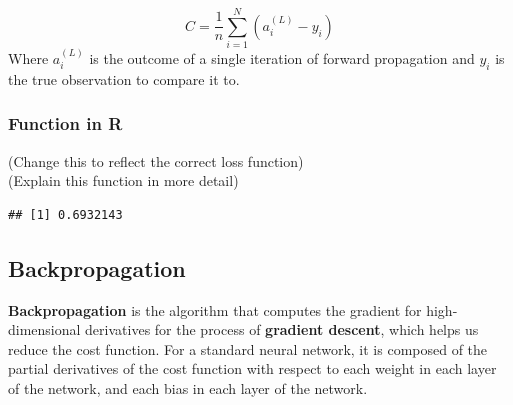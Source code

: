 \[
C = \frac{1}{n} \sum_{i=1}^N (a^{(L)}_i - y_i)
\] Where \(a^{(L)}_i\) is the outcome of a single iteration of forward
propagation and \(y_i\) is the true observation to compare it to.

\hypertarget{function-in-r-3}{%
\subsubsection{Function in R}\label{function-in-r-3}}

(Change this to reflect the correct loss function)\\
(Explain this function in more detail)

\begin{Shaded}
\begin{Highlighting}[]
\OtherTok{\textless{}{-}} 
\OtherTok{\textless{}{-}} \NormalTok{(X)[}\NormalTok{]}
\OtherTok{\textless{}{-}}\NormalTok{ cache[[}\NormalTok{]]  }
\OtherTok{\textless{}{-}}\NormalTok{ (}\SpecialCharTok{*}\SpecialCharTok{+}\NormalTok{ (}\NormalTok{(}\SpecialCharTok{{-}}\SpecialCharTok{*}\NormalTok{ (}\SpecialCharTok{{-}}
\OtherTok{\textless{}{-}} \SpecialCharTok{{-}}\SpecialCharTok{/}
\NormalTok{\}}
\OtherTok{\textless{}{-}} 
\end{Highlighting}
\end{Shaded}

\begin{verbatim}
## [1] 0.6932143
\end{verbatim}

\hypertarget{backpropagation}{%
\subsection{Backpropagation}\label{backpropagation}}

\textbf{Backpropagation} is the algorithm that computes the gradient for
high-dimensional derivatives for the process of \textbf{gradient
descent}, which helps us reduce the cost function. For a standard neural
network, it is composed of the partial derivatives of the cost function
with respect to each weight in each layer of the network, and each bias
in each layer of the network.

